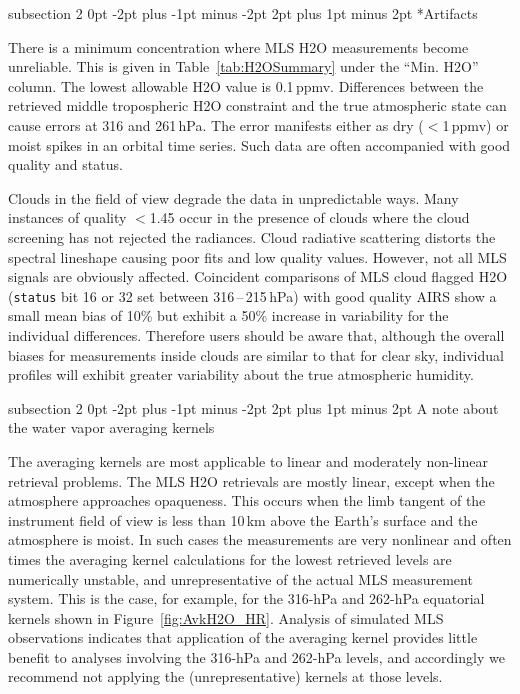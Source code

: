 \documentclass[11pt,draft]{report}
\makeatletter
\renewcommand{\subsection}{\@startsection%
  {subsection}%
  {2}%
  {0pt}%
  {-2pt plus -1pt minus -2pt}%
  {2pt plus 1pt minus 2pt}%
  {\large\sffamily\fontseries{sb}\selectfont\flushleft\color{SectionColor}\figureversion{tabular}}}%
\makeatother
\begin{document}
\subsection*{Artifacts}

There is a minimum concentration where MLS H\cs2O measurements become
unreliable. This is given in Table~\ref{tab:H2OSummary} under the ``Min.
H\cs2O'' column. The lowest allowable H\cs2O value is 0.1\,ppmv.
Differences between the retrieved middle tropospheric H\cs2O constraint
and the true atmospheric state can cause errors at 316 and 261\,hPa.
The error manifests either as dry ($<$1\,ppmv) or moist spikes in an
orbital time series. Such data are often accompanied with good quality
and status.

Clouds in the field of view degrade the data in unpredictable ways. Many
instances of quality $<$1.45 occur in the presence of clouds where the
cloud screening has not rejected the radiances. Cloud radiative
scattering distorts the spectral lineshape causing poor fits and low
quality values.  However, not all MLS signals are obviously
affected. Coincident comparisons of MLS cloud flagged H\cs2O
(\texttt{status} bit 16 or 32 set between 316\,--\,215\,hPa) with good
quality AIRS show a small mean bias of 10\% but exhibit a 50\% increase
in variability for the individual differences. Therefore users should be
aware that, although the overall biases for measurements inside clouds
are similar to that for clear sky, individual profiles will exhibit
greater variability about the true atmospheric humidity.

\subsection{A note about the water vapor averaging kernels}

The averaging kernels are most applicable to linear and moderately
non-linear retrieval problems. The MLS H\cs2O retrievals are mostly
linear, except when the atmosphere approaches opaqueness. This occurs
when the limb tangent of the instrument field of view is less than
10\,km above the Earth's surface and the atmosphere is moist.  In such
cases the measurements are very nonlinear and often times the averaging
kernel calculations for the lowest retrieved levels are numerically
unstable, and unrepresentative of the actual MLS measurement system.
This is the case, for example, for the 316-hPa and 262-hPa equatorial
kernels shown in Figure~\ref{fig:AvkH2O_HR}.  Analysis of simulated MLS
observations indicates that application of the averaging kernel provides
little benefit to analyses involving the 316-hPa and 262-hPa levels, and
accordingly we recommend not applying the (unrepresentative) kernels at
those levels.
\end{document}
